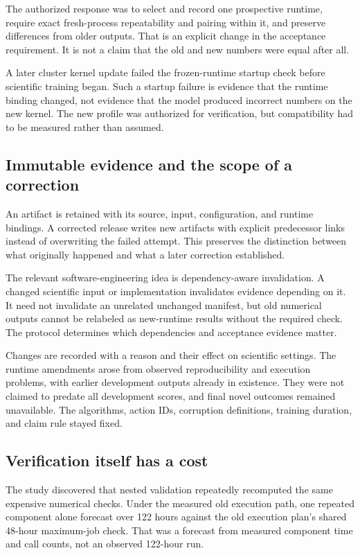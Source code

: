 The authorized response was to select and record one prospective runtime,
require exact fresh-process repeatability and pairing within it, and preserve
differences from older outputs. That is an explicit change in the acceptance
requirement. It is not a claim that the old and new numbers were equal after all.

A later cluster kernel update failed the frozen-runtime startup check before
scientific training began. Such a startup failure is evidence that the runtime
binding changed, not evidence that the model produced incorrect numbers on the
new kernel. The new profile was authorized for verification, but compatibility
had to be measured rather than assumed.

\subsection{Immutable evidence and the scope of a correction}
An artifact is retained with its source, input, configuration, and runtime
bindings. A corrected release writes new artifacts with explicit predecessor
links instead of overwriting the failed attempt. This preserves the distinction
between what originally happened and what a later correction established.

The relevant software-engineering idea is dependency-aware invalidation. A
changed scientific input or implementation invalidates evidence depending on
it. It need not invalidate an unrelated unchanged manifest, but old numerical
outputs cannot be relabeled as new-runtime results without the required check.
The protocol determines which dependencies and acceptance evidence matter.

Changes are recorded with a reason and their effect on scientific settings.
The runtime amendments arose from observed reproducibility and execution
problems, with earlier development outputs already in existence. They were not
claimed to predate all development scores, and final novel outcomes remained
unavailable. The algorithms, action IDs, corruption definitions, training
duration, and claim rule stayed fixed.

\subsection{Verification itself has a cost}
The study discovered that nested validation repeatedly recomputed the same
expensive numerical checks. Under the measured old execution path, one repeated
component alone forecast over 122 hours against the old execution plan's shared
48-hour maximum-job check. That was a forecast from measured component time and call counts, not an
observed 122-hour run.

